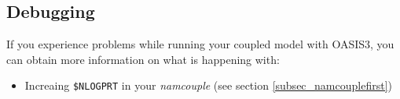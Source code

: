 \subsection{Debugging}

If you experience problems while running your coupled model with OASIS3, you can obtain more information on what is happening with:
\begin{itemize}
\item Increaing {\tt \$NLOGPRT} in your {\it namcouple} (see section \ref{subsec_namcouplefirst})
\end{itemize}

